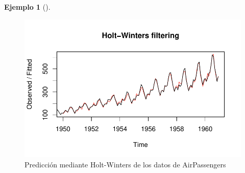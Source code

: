 \documentclass[
  us-letterpaper,
]{scrreprt}
\theoremstyle{definition}
\newtheorem{example}{Ejemplo}[chapter]
\theoremstyle{plain}
\theoremstyle{plain}
\theoremstyle{definition}
\theoremstyle{remark}
\begin{document}
\begin{example}[]
\begin{tcolorbox}
\begin{figure}[H]
\begin{minipage}{0.50\linewidth}
{\includegraphics{series_files/figure-pdf/fig-HWAP-1.pdf}

}


\end{minipage}%
%
\begin{minipage}{0.50\linewidth}



\end{minipage}%

\caption{\label{fig-HWAP}Predicción mediante Holt-Winters de los datos
de AirPassengers}

\end{figure}%

\end{tcolorbox}

\end{example}
\end{document}
